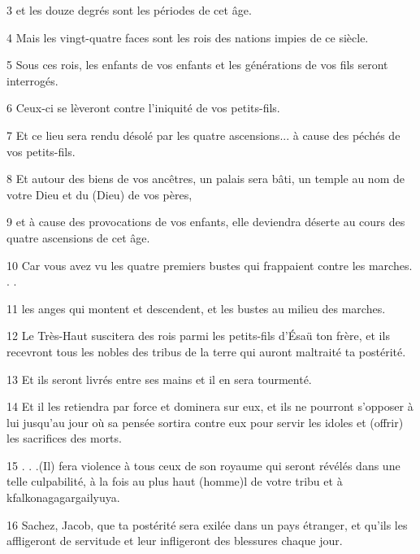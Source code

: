 \par 3 et les douze degrés sont les périodes de cet âge.

\par 4 Mais les vingt-quatre faces sont les rois des nations impies de ce siècle.

\par 5 Sous ces rois, les enfants de vos enfants et les générations de vos fils seront interrogés.

\par 6 Ceux-ci se lèveront contre l'iniquité de vos petits-fils.

\par 7 Et ce lieu sera rendu désolé par les quatre ascensions... à cause des péchés de vos petits-fils.

\par 8 Et autour des biens de vos ancêtres, un palais sera bâti, un temple au nom de votre Dieu et du (Dieu) de vos pères,

\par 9 et à cause des provocations de vos enfants, elle deviendra déserte au cours des quatre ascensions de cet âge.

\par 10 Car vous avez vu les quatre premiers bustes qui frappaient contre les marches. . .

\par 11 les anges qui montent et descendent, et les bustes au milieu des marches.

\par 12 Le Très-Haut suscitera des rois parmi les petits-fils d'Ésaü ton frère, et ils recevront tous les nobles des tribus de la terre qui auront maltraité ta postérité.

\par 13 Et ils seront livrés entre ses mains et il en sera tourmenté.

\par 14 Et il les retiendra par force et dominera sur eux, et ils ne pourront s'opposer à lui jusqu'au jour où sa pensée sortira contre eux pour servir les idoles et (offrir) les sacrifices des morts.

\par 15 . . .(Il) fera violence à tous ceux de son royaume qui seront révélés dans une telle culpabilité, à la fois au plus haut (homme)l de votre tribu et à kfalkonagagargailyuya.

\par 16 Sachez, Jacob, que ta postérité sera exilée dans un pays étranger, et qu'ils les affligeront de servitude et leur infligeront des blessures chaque jour.

